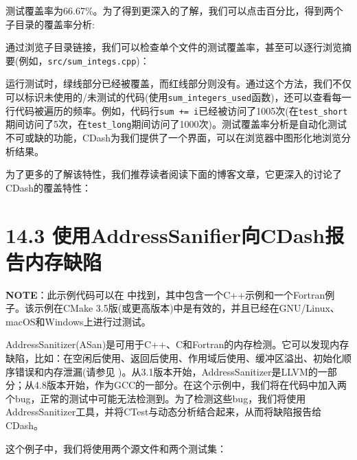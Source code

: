 
测试覆盖率为66.67\%。为了得到更深入的了解，我们可以点击百分比，得到两个子目录的覆盖率分析:


通过浏览子目录链接，我们可以检查单个文件的测试覆盖率，甚至可以逐行浏览摘要(例如，\texttt{src/sum\_integs.cpp})：


运行测试时，绿线部分已经被覆盖，而红线部分则没有。通过这个方法，我们不仅可以标识未使用的/未测试的代码(使用\texttt{sum\_integers\_used}函数)，还可以查看每一行代码被遍历的频率。例如，代码行\texttt{sum += i}已经被访问了1005次(在\texttt{test\_short}期间访问了5次，在\texttt{test\_long}期间访问了1000次)。测试覆盖率分析是自动化测试不可或缺的功能，CDash为我们提供了一个界面，可以在浏览器中图形化地浏览分析结果。


为了更多的了解该特性，我们推荐读者阅读下面的博客文章，它更深入的讨论了CDash的覆盖特性：


\section{14.3 使用AddressSanifier向CDash报告内存缺陷}

\begin{myInfoBox}
\textbf{NOTE}：此示例代码可以在  中找到，其中包含一个C++示例和一个Fortran例子。该示例在CMake 3.5版(或更高版本)中是有效的，并且已经在GNU/Linux、macOS和Windows上进行过测试。
\end{myInfoBox}

AddressSanitizer(ASan)是可用于C++、C和Fortran的内存检测。它可以发现内存缺陷，比如：在空闲后使用、返回后使用、作用域后使用、缓冲区溢出、初始化顺序错误和内存泄漏(请参见  )。从3.1版本开始，AddressSanitizer是LLVM的一部分；从4.8版本开始，作为GCC的一部分。在这个示例中，我们将在代码中加入两个bug，正常的测试中可能无法检测到。为了检测这些bug，我们将使用AddressSanitizer工具，并将CTest与动态分析结合起来，从而将缺陷报告给CDash。


这个例子中，我们将使用两个源文件和两个测试集：

